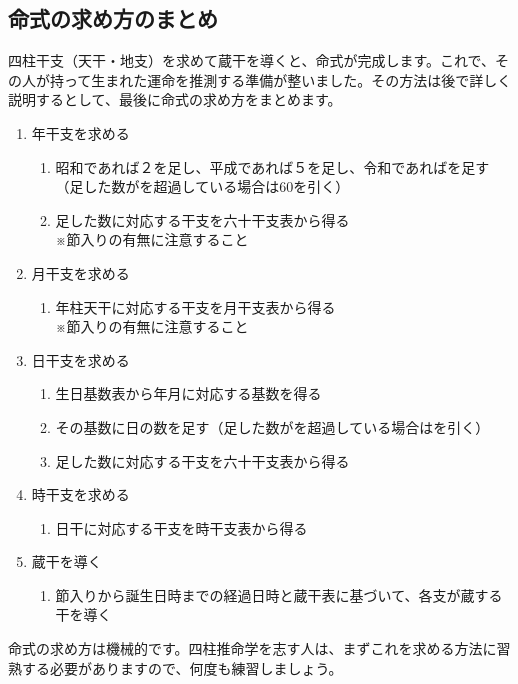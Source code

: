 \documentclass[a5paper,11pt,dvipdfmx]{tarticle}
\begin{document}
\subsection{命式の求め方のまとめ}
四柱干支（天干・地支）を求めて蔵干を導くと、命式が完成します。これで、その人が持って生まれた運命を推測する準備が整いました。その方法は後で詳しく説明するとして、最後に命式の求め方をまとめます。

\begin{enumerate}
  \item 年干支を求める
  \begin{enumerate}
  \item 昭和であれば２を足し、平成であれば５を足し、令和であればを足す（足した数がを超過している場合は60を引く）
  \item 足した数に対応する干支を六十干支表から得る\\
    ※節入りの有無に注意すること
  \end{enumerate}
\item 月干支を求める
  \begin{enumerate}
  \item 年柱天干に対応する干支を月干支表から得る\\
    ※節入りの有無に注意すること
  \end{enumerate}
  \item 日干支を求める
    \begin{enumerate}
    \item 生日基数表から年月に対応する基数を得る
    \item その基数に日の数を足す（足した数がを超過している場合はを引く）
    \item 足した数に対応する干支を六十干支表から得る
    \end{enumerate}
  \item 時干支を求める
    \begin{enumerate}
    \item 日干に対応する干支を時干支表から得る
    \end{enumerate}
  \item 蔵干を導く
    \begin{enumerate}
    \item 節入りから誕生日時までの経過日時と蔵干表に基づいて、各支が蔵する干を導く
    \end{enumerate}
  \end{enumerate}

命式の求め方は機械的です。四柱推命学を志す人は、まずこれを求める方法に習熟する必要がありますので、何度も練習しましょう。
\end{document}
